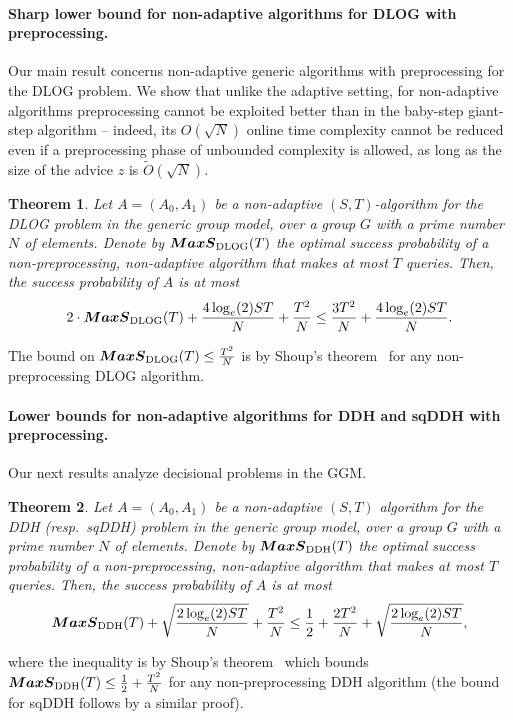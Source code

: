 \documentclass[11pt]{article}
\newtheorem{theorem}{Theorem}[section]
\newcommand{\MAXS}{\boldsymbol{MaxS}}
\begin{document}
\paragraph{Sharp lower bound for non-adaptive algorithms for DLOG with preprocessing.} Our main result concerns non-adaptive generic algorithms with preprocessing for the DLOG problem. We show that unlike the adaptive setting, for non-adaptive algorithms preprocessing cannot be exploited better than in the baby-step giant-step algorithm -- indeed, its $O(\sqrt{N})$ online time complexity cannot be reduced even if a preprocessing phase of unbounded complexity is allowed, as long as the size of the advice $z$ is $\tilde{O}(\sqrt{N})$.
\begin{theorem}\label{thm:dl-nonadaptive-intro}
Let $A=(A_0,A_1)$ be a non-adaptive $(S,T)$-algorithm for the DLOG problem in the generic group model, over a group $G$ with a prime number $N$ of elements. Denote by $\MAXS_{\textup{DLOG}}(T)$ 
the optimal success probability of a non-preprocessing, non-adaptive algorithm that makes at most $T$ queries.
Then, the success probability of $A$ is at most
$$
2\cdot \MAXS_{\textup{DLOG}}(T) + \frac{4\log_e(2) ST}{N} + \frac{T^2}{N} \leq
\frac{3T^2 }{N}  + \frac{4\log_e(2) ST}{N}.
$$
\end{theorem}
The bound on $\MAXS_{\textup{DLOG}}(T) \leq \frac{T^2}{N}$ is by Shoup's theorem~\cite{Shoup97} for any non-preprocessing DLOG algorithm. 


\paragraph{Lower bounds for non-adaptive algorithms for DDH and sqDDH with preprocessing.} 

Our next results analyze decisional problems in the GGM.

\begin{theorem}\label{thm:DDH-intro1}
Let $A=(A_0,A_1)$ be a non-adaptive $(S,T)$ algorithm for the DDH (resp.~sqDDH) problem in the generic group model, over a group $G$ with a prime number $N$ of elements. Denote by $\MAXS_{\textup{DDH}}(T)$ the optimal success probability of a non-preprocessing, non-adaptive algorithm that makes at most $T$ queries. Then, the success probability of $A$ is at most
$$
\MAXS_{\textup{DDH}}(T) + \sqrt{\frac{2\log_e(2) ST}{N}} + \frac{T^2}{N} \leq
\frac{1}{2}+ \frac{2T^2}{N}  + \sqrt{\frac{2\log_e(2)ST}{N}},
$$
\end{theorem}
\noindent where the inequality is by Shoup's theorem~\cite{Shoup97} which bounds $\MAXS_{\textup{DDH}}(T) \leq \frac{1}{2} +\frac{T^2}{N}$ for any non-preprocessing DDH algorithm (the bound for sqDDH follows by a similar proof). 
\end{document}
